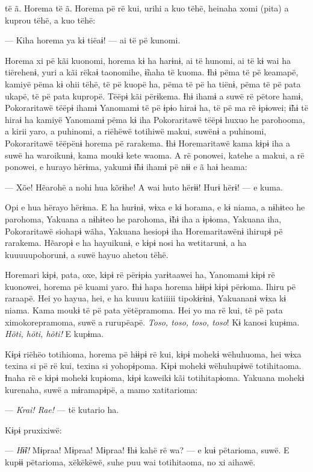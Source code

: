  të ã. Horema të ã. Horema pë rë kui, urihi a kuo tëhë, heinaha xomi
(pita) a kuprou tëhë, a kuo tëhë:

--- Kiha horema ya kɨ tiëaɨ! --- ai të pë kunomi. 

Horema xi pë kãi kuonomi, horema kɨ ha harɨnɨ, ai të hunomi, ai të kɨ
 wai ha tiërehenɨ, yuri a kãi rëkaɨ taonomihe, ɨ̃naha të kuoma. Ɨhɨ pëma
 të pë keamapë, kamiyë pëma kɨ ohii tëhë, të pë kuopë ha, pëma të pë ha
 tiënɨ, pëma të pë pata ukapë, të pë pata kupropë. Tëëpɨ kãi përɨkema.
 Ɨhɨ ihamɨ a suwë rë pëtore hamɨ, Pokoraritawë tëëpɨ ihamɨ Yanomamɨ të pë
 ɨpɨo hiraɨ ha, të pë ma rë ɨpɨowei; ɨ̃hɨ të hiraɨ ha kamiyë Yanomamɨ pëma
 kɨ iha Pokoraritawë tëëpɨ huxuo he parohooma, a kirii yaro, a puhinomi,
 a riëhëwë totihiwë makui, suwënɨ a puhinomi, Pokoraritawë tëëpënɨ horema
 pë rarakema. Ɨhɨ Horemaritawë kama kɨpɨ iha a suwë ha waroikunɨ, kama
 moukɨ kete waoma. A rë ponowei, katehe a makui, a rë ponowei, e hurayo
 hërɨma, yakumɨ ɨ̃hɨ ihamɨ pë nɨɨ e ã haɨ heama: 

--- Xõe! Hẽarohë a nohi hua kõrɨhe! A wai huto hërɨɨ! Hurɨ hërɨ! --- e
 kuma. 

Opi e hua hërayo hërɨma. E ha hurɨnɨ, wɨxa e kɨ horama, e kɨ niama, a
nɨhɨteo he parohoma, Yakuana a nɨhɨteo he parohoma, ɨ̃hɨ iha a ɨpɨoma,
Yakuana iha, Pokoraritawë siohapɨ wãha, Yakuana hesiopɨ iha
Horemaritawënɨ ihirupɨ pë rarakema. Hẽaropɨ e ha hayuikunɨ, e kɨpɨ nosi
ha wetitarunɨ, a ha kuuuuupohorunɨ, a suwë hayuo ahetou tëhë. 

Horemari kɨpɨ, pata, oxe, kɨpɨ rë përɨpɨa yarɨtaawei ha, Yanomamɨ kɨpɨ
rë kuonowei, horema pë kuami yaro. Ɨhɨ hapa horema hɨɨpɨ kɨpɨ përɨoma.
Ihiru pë raraapë. Hei yo hayua, hei, e ha kuuuu katiiiii tipokɨrɨnɨ,
Yakuananɨ wɨxa kɨ niama. Kama moukɨ të pë pata yëtëpramoma. Hei yo ma rë
kui, të pë pata ximokorepramoma, suwë a rurupëapë. \textit{Toso, toso, toso,
toso}! Kɨ kanosi kupɨma. \textit{Hõti, hõti, hõti!} E kupɨma. 

Kɨpɨ riëhëo totihioma, horema pë hɨɨpɨ rë kui, kɨpɨ mohekɨ wëhuhuoma,
hei wɨxa texina si pë rë kui, texina si yohopɨpoma. Kɨpɨ mohekɨ
wëhuhupɨwë totihitaoma. Ɨnaha rë e kɨpɨ mohekɨ kupɨoma, kɨpɨ kaweikɨ kãi
totihitapɨoma. Yakuana mohekɨ kurenaha, suwë a mɨramapɨpë, a mamo
xatitarioma: 

--- \textit{Krai! Rae!} --- të kutario ha. 

Kɨpɨ pruxixiwë: 

--- \textit{Hɨ̃ɨ!} Mɨpraa! Mɨpraa! Mɨpraa! Ɨhɨ kahë rë wa? --- e kuɨ pëtarioma,
 suwë. E kupɨɨ pëtarioma, xëkëkëwë, suhe puu wai totihitaoma, no xi
 aihawë. 

